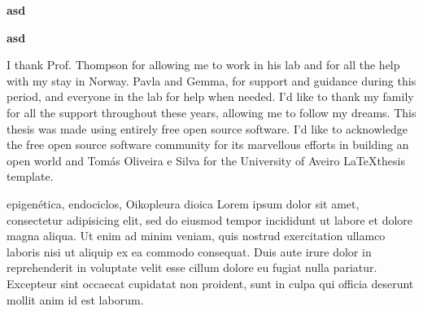 \documentclass[11pt,twoside,a4paper]{report}
\begin{document}
    \TEXT{}
       {\textbf{asd}}
  \vspace*{5mm}
  
    \TEXT{}
       {\textbf{asd}}
  \vspace*{5mm}
  
\EndTitlePage

\cleardoublepage


\TitlePage
  \vspace*{55mm}
        {I thank Prof. Thompson for allowing me to work in his lab and for all the help with my stay in Norway. Pavla and Gemma, for support and guidance during this period, and everyone in the lab for help when needed.}
    \TEXT{}
        {I'd like to thank my family for all the support throughout these years, allowing me to follow my dreams.}
    \TEXT{}
		{This thesis was made using entirely free open source software. I'd like to acknowledge the free open source software community for its marvellous efforts in building an open world and Tomás Oliveira e Silva for the University of Aveiro \LaTeX thesis template.}

\EndTitlePage

\cleardoublepage


\TitlePage
  \vspace*{55mm}
        {epigenética, endociclos, Oikopleura dioica}
    	{Lorem ipsum dolor sit amet, consectetur adipisicing elit, sed do eiusmod tempor incididunt ut labore et dolore magna aliqua. Ut enim ad minim veniam, quis nostrud exercitation ullamco laboris nisi ut aliquip ex ea commodo consequat. Duis aute irure dolor in reprehenderit in voluptate velit esse cillum dolore eu fugiat nulla pariatur. Excepteur sint occaecat cupidatat non proident, sunt in culpa qui officia deserunt mollit anim id est laborum.}
\EndTitlePage

\cleardoublepage
\end{document}
